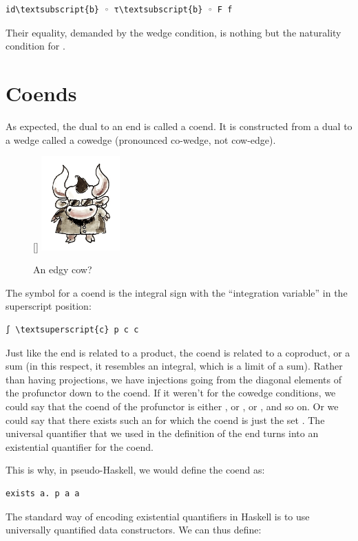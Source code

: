 \begin{Verbatim}[commandchars=\\\{\}]
id\textsubscript{b} ◦ τ\textsubscript{b} ◦ F f
\end{Verbatim}
Their equality, demanded by the wedge condition, is nothing but the
naturality condition for .

\section{Coends}\label{coends}
As expected, the dual to an end is called a coend. It is constructed
from a dual to a wedge called a cowedge (pronounced co-wedge, not
cow-edge).

\begin{figure}
\raisebox{0pt}[\dimexpr{}\baselineskip\relax]{
\includegraphics[width=30mm]{images/end-31.jpg}}%
\caption{An edgy cow?}
\end{figure}

The symbol for a coend is the integral sign with the ``integration
variable'' in the superscript position:

\begin{Verbatim}[commandchars=\\\{\}]
∫ \textsuperscript{c} p c c
\end{Verbatim}
Just like the end is related to a product, the coend is related to a
coproduct, or a sum (in this respect, it resembles an integral, which is
a limit of a sum). Rather than having projections, we have injections
going from the diagonal elements of the profunctor down to the coend. If
it weren't for the cowedge conditions, we could say that the coend of
the profunctor  is either , or
, or , and so on. Or we could say that
there exists such an  for which the coend is just the set
. The universal quantifier that we used in the
definition of the end turns into an existential quantifier for the
coend.

This is why, in pseudo-Haskell, we would define the coend as:

\begin{verbatim}
exists a. p a a
\end{verbatim}
The standard way of encoding existential quantifiers in Haskell is to
use universally quantified data constructors. We can thus define:

